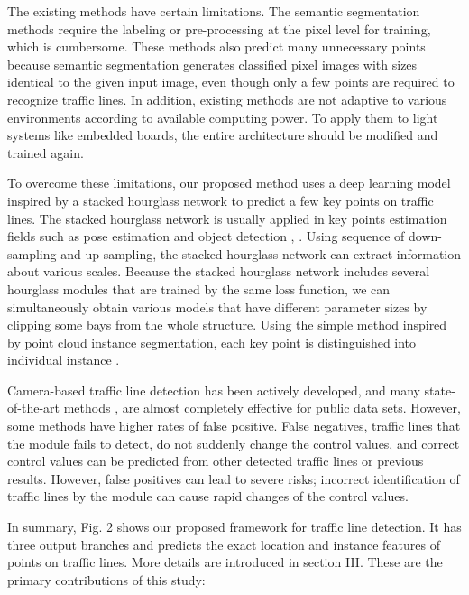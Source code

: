 \documentclass[journal]{IEEEtran}
\begin{document}
The existing methods have certain limitations. The semantic segmentation methods require the labeling or pre-processing at the pixel level for training, which is cumbersome. These methods also predict many unnecessary points because semantic segmentation generates classified pixel images with sizes identical to the given input image, even though only a few points are required to recognize traffic lines. In addition, existing methods are not adaptive to various environments according to available computing power. To apply them to light systems like embedded boards, the entire architecture should be modified and trained again.

To overcome these limitations, our proposed method uses a deep learning model inspired by a stacked hourglass network to predict a few key points on traffic lines. The stacked hourglass network \cite{newell2016stacked} is usually applied in key points estimation fields such as pose estimation \cite{yang2017learning} and object detection \cite{9010985}, \cite{zhou2019bottom}. Using sequence of down-sampling and up-sampling, the stacked hourglass network can extract information about various scales. Because the stacked hourglass network includes several hourglass modules that are trained by the same loss function, we can simultaneously obtain various models that have different parameter sizes by clipping some bays from the whole structure. Using the simple method inspired by point cloud instance segmentation, each key point is distinguished into individual instance \cite{wang2018sgpn}.

Camera-based traffic line detection has been actively developed, and many state-of-the-art methods \cite{hou2019learning}, \cite{8624563} are almost completely effective for public data sets. However, some methods have higher rates of false positive. False negatives, traffic lines that the module fails to detect, do not suddenly change the control values, and correct control values can be predicted from other detected traffic lines or previous results. However, false positives can lead to severe risks; incorrect identification of traffic lines by the module can cause rapid changes of the control values.

In summary, Fig. 2 shows our proposed framework for traffic line detection. It has three output branches and predicts the exact location and instance features of points on traffic lines. More details are introduced in section III. These are the primary contributions of this study:
\end{document}
